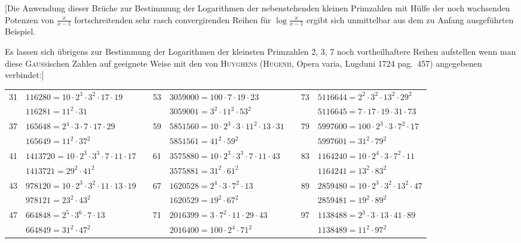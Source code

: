 \documentclass[10pt,a4paper]{article}
\begin{document}
[Die Anwendung dieser Br\"uche zur Bestimmung der Logarithmen der nebenstehenden kleinen Primzahlen mit H\"ulfe der noch wachsenden Potenzen von $\frac{x}{x-1}$ fortschreitenden sehr rasch convergirenden Reihen f\"ur $\log \frac{x}{x-1}$ ergibt sich unmittelbar aus dem zu Anfang ausgef\"uhrten Beispiel.

Es lassen sich \"ubrigens zur Bestimmung der Logarithmen der kleinsten Primzahlen 2, 3, 7 noch vortheilhaftere Reihen aufstellen wenn man diese G\textsc{auss}ischen Zahlen auf geeignete Weise mit den von H\textsc{uyghens} (H\textsc{ugenii}, Opera varia, Lugduni 1724 pag.~457) angegebenen verbindet:]

\newpage

\begin{center}
\small
\begin{tabular}{r l c r l c r l}
31 & $116280 = 10 \cdot 2^3 \cdot 3^2 \cdot 17 \cdot 19$ & \quad & 53 & $3059000 = 100 \cdot 7 \cdot 19 \cdot 23$ & \quad & 73 & $5116644 = 2^2 \cdot 3^2 \cdot 13^2 \cdot 29^2$ \\
   & $116281 = 11^2 \cdot 31$ & & & $3059001 = 3^2 \cdot 11^2 \cdot 53^2$ & & & $5116645 = 7 \cdot 17 \cdot 19 \cdot 31 \cdot 73$ \\[1ex]
37 & $165648 = 2^4 \cdot 3 \cdot 7 \cdot 17 \cdot 29$ & & 59 & $5851560 = 10 \cdot 2^3 \cdot 3 \cdot 11^2 \cdot 13 \cdot 31$ & & 79 & $5997600 = 100 \cdot 2^3 \cdot 3 \cdot 7^2 \cdot 17$ \\
   & $165649 = 11^2 \cdot 37^2$ & & & $5851561 = 41^2 \cdot 59^2$ & & & $5997601 = 31^2 \cdot 79^2$ \\[1ex]
41 & $1413720 = 10 \cdot 2^3 \cdot 3^3 \cdot 7 \cdot 11 \cdot 17$ & & 61 & $3575880 = 10 \cdot 2^3 \cdot 3^3 \cdot 7 \cdot 11 \cdot 43$ & & 83 & $1164240 = 10 \cdot 2^4 \cdot 3 \cdot 7^2 \cdot 11$ \\
   & $1413721 = 29^2 \cdot 41^2$ & & & $3575881 = 31^2 \cdot 61^2$ & & & $1164241 = 13^2 \cdot 83^2$ \\[1ex]
43 & $978120 = 10 \cdot 2^3 \cdot 3^2 \cdot 11 \cdot 13 \cdot 19$ & & 67 & $1620528 = 2^4 \cdot 3 \cdot 7^2 \cdot 13$ & & 89 & $2859480 = 10 \cdot 2^3 \cdot 3^2 \cdot 13^2 \cdot 47$ \\
   & $978121 = 23^2 \cdot 43^2$ & & & $1620529 = 19^2 \cdot 67^2$ & & & $2859481 = 19^2 \cdot 89^2$ \\[1ex]
47 & $664848 = 2^5 \cdot 3^6 \cdot 7 \cdot 13$ & & 71 & $2016399 = 3 \cdot 7^2 \cdot 11 \cdot 29 \cdot 43$ & & 97 & $1138488 = 2^3 \cdot 3 \cdot 13 \cdot 41 \cdot 89$ \\
   & $664849 = 31^2 \cdot 47^2$ & & & $2016400 = 100 \cdot 2^4 \cdot 71^2$ & & & $1138489 = 11^2 \cdot 97^2$ \\[1ex]
\end{tabular}
\end{center}
\end{document}
